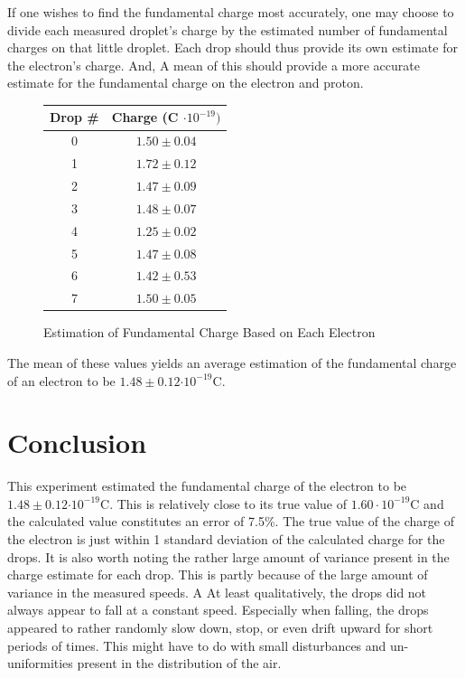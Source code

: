 \documentclass[]{article}
\begin{document}
If one wishes to find the fundamental charge most accurately, one may choose to divide each measured droplet's charge by the estimated number of fundamental charges on that little droplet. Each drop should thus provide its own estimate for the electron's charge. And, A mean of this should provide a more accurate estimate for the fundamental charge on the electron and proton.
\begin{figure}
	\centering
	\caption{Estimation of Fundamental Charge Based on Each Electron}
\begin{tabular}{|c|c|}
	\hline
	Drop \# & Charge (C \(\cdot 10^{-19})\) \\ \hline
	0 &  \( 1.50 \pm 0.04\) \\
	1 &  \( 1.72 \pm 0.12\) \\
	2 &  \( 1.47 \pm 0.09\) \\
	3 &  \( 1.48 \pm 0.07\) \\
	4 &  \( 1.25 \pm 0.02\) \\
	5 &  \( 1.47 \pm 0.08\) \\
	6 &  \( 1.42 \pm 0.53\) \\
	7 &  \( 1.50 \pm 0.05\) \\
	\hline
\end{tabular}
\end{figure}

The mean of these values yields an average estimation of the fundamental charge of an electron to be \(1.48 \pm 0.12 \mathrm{\cdot 10^{-19} C}\).
\section{Conclusion}
This experiment estimated the fundamental charge of the electron to be \(1.48 \pm 0.12 \mathrm{\cdot 10^{-19} C}\). This is relatively close to its true value of \(1.60 \cdot 10^{-19} \mathrm{C}\) and the calculated value constitutes an error of 7.5\%. The true value of the charge of the electron is just within 1 standard deviation of the calculated charge for the drops. It is also worth noting the rather large amount of variance present in the charge estimate for each drop. This is partly because of the large amount of variance in the measured speeds. A At least qualitatively, the drops did not always appear to fall at a constant speed. Especially when falling, the drops appeared to rather randomly slow down, stop, or even drift upward for short periods of times. This might have to do with small disturbances and un-uniformities present in the distribution of the air. 
\end{document}
